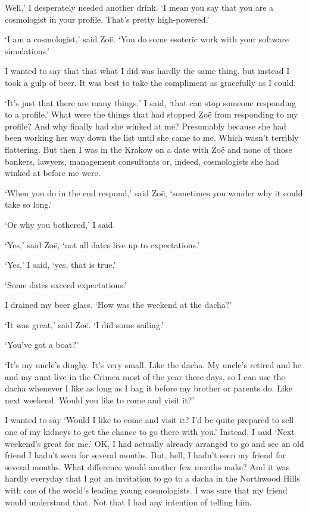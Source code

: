 Well,' I desperately needed another drink. `I mean you say that you
are a cosmologist in your profile. That's pretty high-powered.'

`I am a cosmologist,' said Zoë. `You do some esoteric work with
your software simulations.'

I wanted to say that that what I did was hardly the same thing, but
instead I took a gulp of beer. It was best to take the compliment as
gracefully as I could.

`It's just that there are many things,' I said, `that can stop
someone responding to a profile.' What were the things that had
stopped Zoë from responding to my profile? And why finally had
she winked at me? Presumably because she had been working her way down the
list until she came to me. Which wasn't terribly flattering. But then I was
in the Krakow on a date with Zoë and none of those bankers,
lawyers, management consultants or, indeed, cosmologists she had winked at before me were.

`When you do in the end respond,' said Zoë, `sometimes you
wonder why it could take so long.'

`Or why you bothered,' I said.

`Yes,' said Zoë, `not all dates live up to expectations.'

`Yes,' I said, `yes, that is true.'

`Some dates exceed expectations.'

I drained my beer glass. `How was the weekend at the dacha?'

`It was great,' said Zoë. `I did some sailing.'

`You've got a boat?'

`It's my uncle's dinghy. It's very small. Like the dacha. My uncle's
retired and he and my aunt live in the Crimea most of the year these
days, so I can use the dacha whenever I like as long as I bag it
before my brother or parents do. Like next weekend. Would you like
to come and visit it?'

I wanted to say `Would I like to come and visit it? I'd be quite
prepared to sell one of my kidneys to get the chance to go there
with you.' Instead, I said `Next weekend's great for me.' OK, I had
actually already arranged to go and see an old friend I hadn't seen
for several months. But, hell, I hadn't seen my friend for several
months. What difference would another few months make? And it was
hardly everyday that I got an invitation to go to a dacha in the
Northwood Hills with one of the world's leading young cosmologists.
I was sure that my friend would understand that. Not that I had any
intention of telling him.

